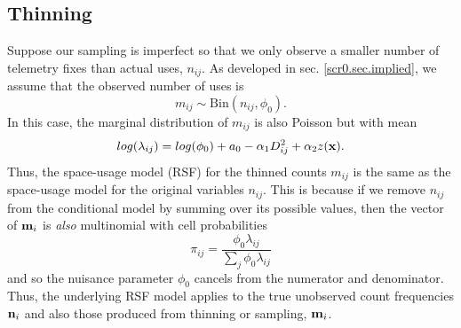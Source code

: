 \subsection{Thinning}

Suppose our sampling is imperfect so that we only observe a smaller
number of telemetry fixes than actual uses, $n_{ij}$. As developed in
sec. \ref{scr0.sec.implied}, we assume that the observed number of
uses is
\[
 m_{ij} \sim \mbox{Bin}(n_{ij}, \phi_{0}).
\]
In this case, the marginal distribution of $m_{ij}$ is also Poisson
but with mean
\[
 log(\lambda_{ij}) = log(\phi_{0}) + a_{0} -\alpha_{1} D_{ij}^{2} +  \alpha_{2} z({\bf x}).
\]
Thus, the space-usage model (RSF) for the
thinned counts $m_{ij}$ is the same as the space-usage model for the
original variables $n_{ij}$.  This is because if we remove $n_{ij}$
from the conditional
 model by summing over its possible values, then the vector of
${\bf m}_{i}$ is {\it also}  multinomial with cell probabilities
\[
\pi_{ij} = \frac{\phi_{0}\lambda_{ij}}{\sum_{j} \phi_{0} \lambda_{ij}}
\]
and so the nuisance parameter $\phi_{0}$ cancels from the numerator and
denominator. Thus, the underlying RSF model applies to the true
unobserved count frequencies ${\bf n}_{i}$ and also those produced
from thinning or sampling, ${\bf m}_{i}$.


